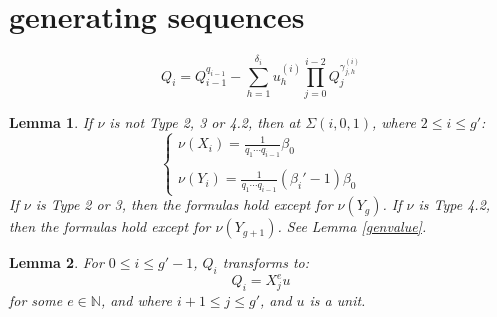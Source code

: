 \documentclass[10pt,a4paper]{amsart}
\newtheorem{lem}{Lemma}
\begin{document}
\section{generating sequences} \label{sectgs}

\begin{equation}  \label{genrecur}
Q_i=Q_{i-1}^{q_{i-1}}-\sum_{h=1}^{\delta_i} u_h^{(i)} \prod_{j=0}^{i-2} Q_j^{\gamma_{j,h}^{(i)}}
\end{equation}

\begin{lem} \label{beta'-1} If $\nu$ is not Type 2, 3 or 4.2, then at $\Sigma(i,0,1)$, where $2\leq i \leq g'$:
\begin{equation*}
\left\{
\begin{array}{l}
\displaystyle \nu(X_i)=\frac{1}{q_1\cdots q_{i-1}}\beta_0
\\\\
\displaystyle \nu(Y_i)=\frac{1}{q_1\cdots q_{i-1}}\left(\beta_i'-1\right)\beta_0
\end{array}
\right.
\end{equation*}
If $\nu$ is Type 2 or 3, then the formulas hold except for $\nu(Y_g)$. If $\nu$ is Type 4.2, then the formulas hold except for $\nu(Y_{g+1})$. See Lemma \ref{genvalue}.
\end{lem}

\begin{lem} \label{leveli+}
For $0\leq i\leq g'-1$, $Q_i$ transforms to:
\begin{equation*}
Q_i=X_{j}^eu
\end{equation*}
for some $e\in\mathbb{N}$, and where $i+1\leq j\leq g'$, and $u$ is a unit.
\end{lem}
\end{document}
